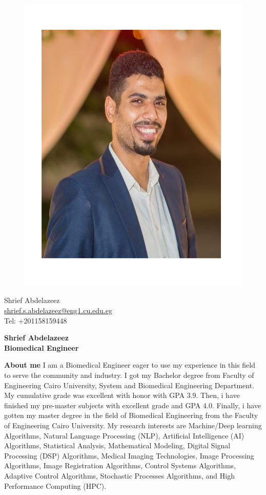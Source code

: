 \documentclass[a4paper,12pt,final]{memoir}
\newcommand{\Sep}{\vspace{1.5em}}
\newenvironment{AboutMe}
	{\ignorespaces\textbf{\color{RoyalBlue} About me}}
	{\Sep\ignorespacesafterend}
\begin{document}
\begin{figure}
	\hfill
	\includegraphics[width=0.6\columnwidth]{photo.pdf}
	\vspace{-7cm}
\end{figure}

\begin{flushright}\Small
	Shrief Abdelazeez \\
	\url{shrief.s.abdelazeez@eng1.cu.edu.eg}  \\
     Tel: +201158159448
\end{flushright}\normalsize
\framebreak


\Huge\bfseries {\color{RoyalBlue} Shrief Abdelazeez} \\
\Large\bfseries  Biomedical Engineer \\

\normalsize\normalfont

\begin{AboutMe}
I am a Biomedical Engineer eager to use my experience in this field to serve the community and industry. I got my Bachelor degree from Faculty of Engineering Cairo University, System and Biomedical Engineering Department. My cumulative grade was excellent with honor with GPA 3.9. Then, i have finished my pre-master subjects with excellent grade and GPA 4.0. Finally, i have gotten my master degree in the field of Biomedical Engineering from the Faculty of Engineering Cairo University. My research interests are Machine/Deep learning Algorithms, Natural Language Processing (NLP), Artificial Intelligence (AI) Algorithms, Statistical Analysis, Mathematical Modeling, Digital Signal Processing (DSP) Algorithms, Medical Imaging Technologies, Image Processing Algorithms, Image Registration Algorithms, Control Systems Algorithms, Adaptive Control Algorithms, Stochastic Processes Algorithms, and High Performance Computing (HPC).
\end{AboutMe}
\end{document}
